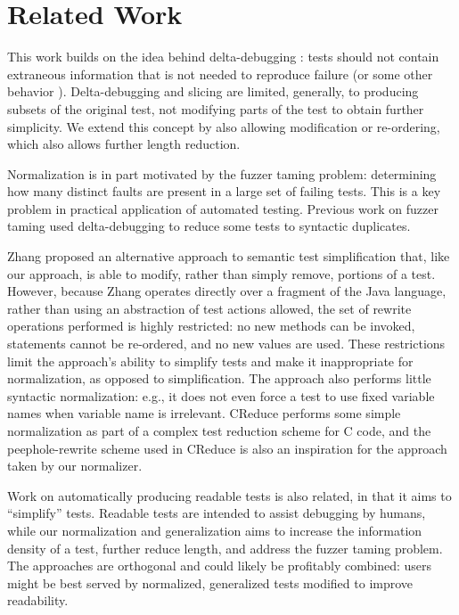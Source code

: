 \section{Related Work}

This work builds on the idea behind delta-debugging \cite{DD}: tests should not contain extraneous information that is not needed to
reproduce failure (or some other behavior \cite{icst2014,stvrcausereduce}).  Delta-debugging and slicing
\cite{TCminim} are limited, generally, to producing subsets of the
original test, not modifying parts of the test to obtain further
simplicity.  We extend this concept by also allowing modification or
re-ordering, which also allows further length reduction.


Normalization is in part motivated by the fuzzer taming \cite{PLDI13}
problem: determining how many distinct faults are present in a large
set of failing tests.  This is a key problem in practical
application of automated testing.  Previous work on fuzzer taming
\cite{PLDI13} used delta-debugging to reduce some tests to
syntactic duplicates.

Zhang \cite{SaiSimple} proposed an alternative approach to semantic
test simplification that, like our approach, is able to modify, rather
than simply remove, portions of a test.  However, because Zhang
operates directly over a fragment of the Java language, rather than
using an abstraction of test actions allowed, the set of rewrite
operations performed is highly restricted: no new methods can be
invoked, statements cannot be re-ordered, and no new values are used.
These restrictions limit the approach's ability to simplify tests and
make it inappropriate for  normalization, as opposed to simplification.  The approach also performs little
syntactic normalization: e.g., it does not even force a test to use
fixed variable names when variable name is irrelevant.  CReduce
\cite{CReduce} performs some simple normalization as part of a complex
test reduction scheme for C code, and the peephole-rewrite scheme
used in CReduce is also an inspiration for the approach taken by our
normalizer.

Work on automatically producing readable tests \cite{Guava,Readable} is also
related, in that it aims to ``simplify'' tests.  Readable tests are
intended to assist debugging by humans, while our
normalization and generalization aims to increase the information
density of a test, further reduce length, and address the fuzzer taming problem.  The approaches are
orthogonal and could likely be profitably combined: users might be
best served by normalized, generalized tests modified to improve readability.

